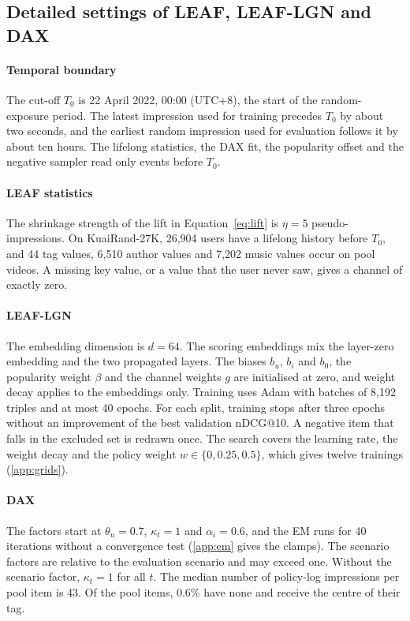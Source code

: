 \documentclass[preprint,12pt,authoryear]{elsarticle}
\begin{document}
\subsection{Detailed settings of LEAF, LEAF-LGN and DAX}\label{app:impl}

\paragraph{Temporal boundary} The cut-off $T_0$ is 22 April 2022, 00:00 (UTC+8), the start of the random-exposure period. The latest impression used for
training precedes $T_0$ by about two seconds, and the earliest random impression used for evaluation follows it by about ten hours. The lifelong
statistics, the DAX fit, the popularity offset and the negative sampler read only events before $T_0$.

\paragraph{LEAF statistics} The shrinkage strength of the lift in Equation~\eqref{eq:lift} is $\eta=5$ pseudo-impressions. On KuaiRand-27K, 26,904 users
have a lifelong history before $T_0$, and 44 tag values, 6,510 author values and 7,202 music values occur on pool videos. A missing key value, or a value
that the user never saw, gives a channel of exactly zero.

\paragraph{LEAF-LGN} The embedding dimension is $d=64$. The scoring embeddings mix the layer-zero embedding and the two propagated layers. The biases
$b_u$, $b_i$ and $b_0$, the popularity weight $\beta$ and the channel weights $g$ are initialised at zero, and weight decay applies to the embeddings only.
Training uses Adam with batches of 8,192 triples and at most 40 epochs. For each split, training stops after three epochs without an improvement of the
best validation nDCG@10. A negative item that falls in the excluded set is redrawn once. The search covers the learning rate, the weight decay and the
policy weight $w\in\{0,0.25,0.5\}$, which gives twelve trainings (\ref{app:grids}).

\paragraph{DAX} The factors start at $\theta_u=0.7$, $\kappa_t=1$ and $\alpha_i=0.6$, and the EM runs for 40 iterations without a convergence test
(\ref{app:em} gives the clamps). The scenario factors are relative to the evaluation scenario and may exceed one. Without the scenario factor,
$\kappa_t=1$ for all $t$. The median number of policy-log impressions per pool item is 43. Of the pool items, 0.6\% have none and receive the centre of
their tag.
\end{document}
